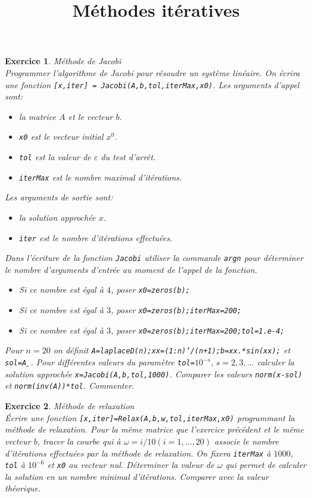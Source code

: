 \documentclass[leqno]{article}
\title{M\'ethodes it\'eratives}
\author{}
\theoremstyle{exo}
\theoremstyle{exo}
\newtheorem{exe}{Exercice}
\begin{document}
\maketitle

\begin{exe}{\it M\'ethode de Jacobi}\\
Programmer l'algorithme de Jacobi pour r\'esoudre un syst\`eme lin\'eaire. On \'ecrira une fonction \texttt{[x,iter] = Jacobi(A,b,tol,iterMax,x0)}. Les arguments d'appel sont:
\begin{itemize}
\item la matrice $A$ et le vecteur $b$.
\item \texttt{x0} est le vecteur initial $x^0$.
\item \texttt{tol} est la valeur de $\varepsilon$ du test d'arr\^et.
\item \texttt{iterMax} est le nombre maximal d'it\'erations.
\end{itemize} 
Les arguments de sortie sont:
\begin{itemize}
\item la solution approch\'ee $x$.
\item \texttt{iter} est le nombre d'it\'erations effectu\'ees.
\end{itemize}
Dans l'\'ecriture de la fonction \texttt{Jacobi} utiliser la commande \texttt{argn} pour d\'eterminer le nombre d'arguments d'entr\'ee au moment de l'appel de la fonction.
\begin{itemize}
\item Si ce nombre est \'egal \`a $4$, poser \texttt{x0=zeros(b);}
\item Si ce nombre est \'egal \`a $3$, poser \texttt{x0=zeros(b);iterMax=200;}
\item Si ce nombre est \'egal \`a $3$, poser \texttt{x0=zeros(b);iterMax=200;tol=1.e-4;}
\end{itemize}
Pour $n=20$ on d\'efinit \texttt{A=laplaceD(n);xx=(1:n)'/(n+1);b=xx.*sin(xx);} et \texttt{sol=A\b}. Pour diff\'erentes valeurs du param\`etre \texttt{tol=}$10^{-s},\,s=2,3,...$ calculer la solution approch\'ee \texttt{x=Jacobi(A,b,tol,1000)}. Comparer les valeurs \texttt{norm(x-sol)} et \texttt{norm(inv(A))*tol}. Commenter. 
\end{exe}

\begin{exe}{\it M\'ethode de relaxation}\\
\'Ecrire une fonction \texttt{[x,iter]=Relax(A,b,w,tol,iterMax,x0)} programmant la m\'ethode de relaxation. Pour la m\^eme matrice que l'exercice pr\'ec\'edent et le m\^eme vecteur $b$, tracer la courbe qui \`a $\omega=i/10(i=1,...,20)$ associe le nombre d'it\'erations effectu\'ees par la m\'ethode de relaxation. On fixera \texttt{iterMax} \`a $1000$, \texttt{tol} \`a $10^{-6}$ et \texttt{x0} au vecteur nul. D\'eterminer la valeur de $\omega$ qui permet de calculer la solution en un nombre minimal d'it\'erations. Comparer avec la valeur th\'eorique.   
\end{exe}
\end{document}
